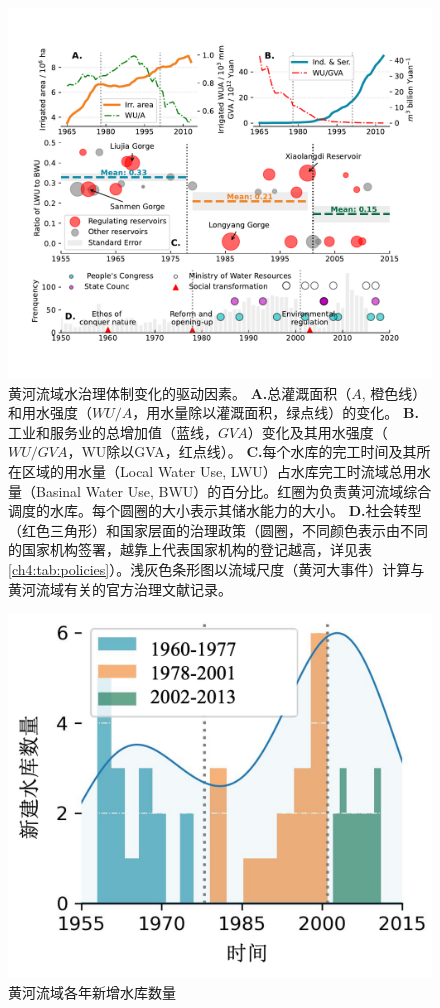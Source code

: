 

\begin{figure}[th!]
	\centering
	\includegraphics[width=\textwidth]{img/ch4/causes.pdf}
	\caption[黄河流域水治理体制变化的驱动因素]{
		黄河流域水治理体制变化的驱动因素。
		\textbf{A.}总灌溉面积（$A$, 橙色线）和用水强度（$WU/A$，用水量除以灌溉面积，绿点线）的变化。
        \textbf{B.}工业和服务业的总增加值（蓝线，$GVA$）变化及其用水强度（$WU/GVA$，WU除以GVA，红点线）。
        \textbf{C.}每个水库的完工时间及其所在区域的用水量（Local Water Use, LWU）占水库完工时流域总用水量（Basinal Water Use, BWU）的百分比。红圈为负责黄河流域综合调度的水库。每个圆圈的大小表示其储水能力的大小。
        \textbf{D.}社会转型（红色三角形）和国家层面的治理政策（圆圈，不同颜色表示由不同的国家机构签署，越靠上代表国家机构的登记越高，详见表\ref{ch4:tab:policies}）。浅灰色条形图以流域尺度（黄河大事件）计算与黄河流域有关的官方治理文献记录。}\label{ch4:fig:mechanism}
\end{figure}


\begin{figure}[tb]
    \centering
    \includegraphics[width=0.6\linewidth]{img/ch4/ch4_reservoirs.png}
    \caption{黄河流域各年新增水库数量}\label{ch4:fig:reservoirs}
\end{figure}


